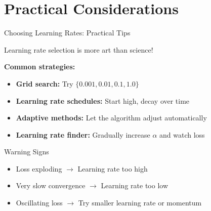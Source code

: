 \documentclass[usenames,dvipsnames]{beamer}
\begin{document}
  \section{Practical Considerations}

  \begin{frame}{Choosing Learning Rates: Practical Tips}
    \begin{keypointsbox}
    Learning rate selection is more art than science!
    \end{keypointsbox}
    
    \pause
    \textbf{Common strategies:}
    \begin{itemize}[<+->]
        \item \textbf{Grid search:} Try $\{0.001, 0.01, 0.1, 1.0\}$
        \item \textbf{Learning rate schedules:} Start high, decay over time
        \item \textbf{Adaptive methods:} Let the algorithm adjust automatically
        \item \textbf{Learning rate finder:} Gradually increase $\alpha$ and watch loss
    \end{itemize}
    
    \pause
    \begin{alertbox}{Warning Signs}
    \begin{itemize}
        \item Loss exploding $\rightarrow$ Learning rate too high
        \item Very slow convergence $\rightarrow$ Learning rate too low  
        \item Oscillating loss $\rightarrow$ Try smaller learning rate or momentum
    \end{itemize}
    \end{alertbox}
  \end{frame}
\end{document}
